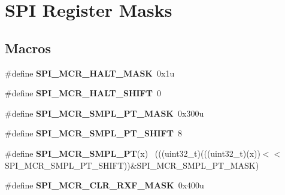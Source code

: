 \hypertarget{group___s_p_i___register___masks}{}\section{S\+P\+I Register Masks}
\label{group___s_p_i___register___masks}
\subsection*{Macros}
\begin{DoxyCompactItemize}
\item 
\hypertarget{group___s_p_i___register___masks_ga88c670302548b2d5b5f032b5709bc366}{}\#define {\bfseries S\+P\+I\+\_\+\+M\+C\+R\+\_\+\+H\+A\+L\+T\+\_\+\+M\+A\+S\+K}~0x1u\label{group___s_p_i___register___masks_ga88c670302548b2d5b5f032b5709bc366}

\item 
\hypertarget{group___s_p_i___register___masks_ga8f13f49cf8502462271d8a179338d81b}{}\#define {\bfseries S\+P\+I\+\_\+\+M\+C\+R\+\_\+\+H\+A\+L\+T\+\_\+\+S\+H\+I\+F\+T}~0\label{group___s_p_i___register___masks_ga8f13f49cf8502462271d8a179338d81b}

\item 
\hypertarget{group___s_p_i___register___masks_gaebb0539e04af465a39892f5aaabc872d}{}\#define {\bfseries S\+P\+I\+\_\+\+M\+C\+R\+\_\+\+S\+M\+P\+L\+\_\+\+P\+T\+\_\+\+M\+A\+S\+K}~0x300u\label{group___s_p_i___register___masks_gaebb0539e04af465a39892f5aaabc872d}

\item 
\hypertarget{group___s_p_i___register___masks_ga1ffc13b9075cc6b0b34ea3162d6c1b74}{}\#define {\bfseries S\+P\+I\+\_\+\+M\+C\+R\+\_\+\+S\+M\+P\+L\+\_\+\+P\+T\+\_\+\+S\+H\+I\+F\+T}~8\label{group___s_p_i___register___masks_ga1ffc13b9075cc6b0b34ea3162d6c1b74}

\item 
\hypertarget{group___s_p_i___register___masks_ga5c2964171c6cf43a92d15e15373ed2ae}{}\#define {\bfseries S\+P\+I\+\_\+\+M\+C\+R\+\_\+\+S\+M\+P\+L\+\_\+\+P\+T}(x)                                          ~(((uint32\+\_\+t)(((uint32\+\_\+t)(x))$<$$<$S\+P\+I\+\_\+\+M\+C\+R\+\_\+\+S\+M\+P\+L\+\_\+\+P\+T\+\_\+\+S\+H\+I\+F\+T))\&S\+P\+I\+\_\+\+M\+C\+R\+\_\+\+S\+M\+P\+L\+\_\+\+P\+T\+\_\+\+M\+A\+S\+K)\label{group___s_p_i___register___masks_ga5c2964171c6cf43a92d15e15373ed2ae}

\item 
\hypertarget{group___s_p_i___register___masks_gaedd370380f06f2e4bf2ca01babda8732}{}\#define {\bfseries S\+P\+I\+\_\+\+M\+C\+R\+\_\+\+C\+L\+R\+\_\+\+R\+X\+F\+\_\+\+M\+A\+S\+K}~0x400u\label{group___s_p_i___register___masks_gaedd370380f06f2e4bf2ca01babda8732}


\end{DoxyCompactItemize}
